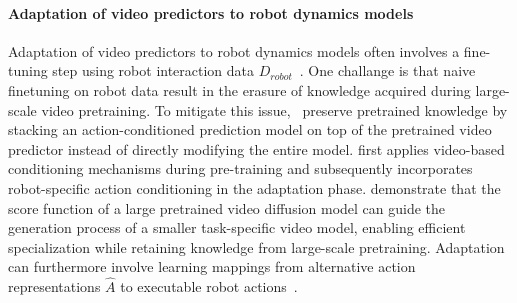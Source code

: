 \paragraph{Adaptation of video predictors to robot dynamics models}
Adaptation of video predictors to robot dynamics models often involves a fine-tuning step using robot interaction data $D_{robot}$~\cite{Du2023LearningUP, Ajay2023CompositionalFM}.
One challange is that naive finetuning on robot data result in the erasure of %
knowledge acquired during large-scale video pretraining. To mitigate this issue,~\cite{Seo2022ReinforcementLW} preserve pretrained knowledge by stacking an action-conditioned prediction model on top of the pretrained video predictor instead of directly modifying the entire model. 
\textcite{Mendonca2023StructuredWM} first applies video-based conditioning mechanisms during pre-training and subsequently incorporates robot-specific action conditioning in the adaptation phase. 
\textcite{Yang2023ProbabilisticAO} demonstrate that the score function of a large pretrained video diffusion model can guide the generation process of a smaller task-specific video model, enabling efficient specialization while retaining knowledge from large-scale pretraining.
Adaptation can furthermore involve learning mappings from alternative action representations $\hat{A}$ to executable robot actions~\cite{Rybkin2018LearningWY}.

